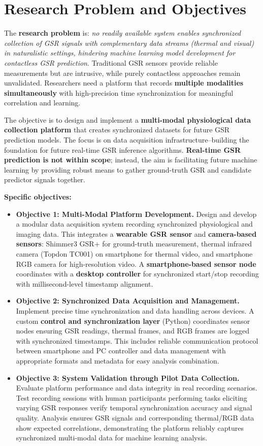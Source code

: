 \section{Research Problem and Objectives}

The \textbf{research problem} is: \textit{no readily available system enables synchronized collection of GSR signals with complementary data streams (thermal and visual) in naturalistic settings, hindering machine learning model development for contactless GSR prediction}. Traditional GSR sensors provide reliable measurements but are intrusive, while purely contactless approaches remain unvalidated. Researchers need a platform that records \textbf{multiple modalities simultaneously} with high-precision time synchronization for meaningful correlation and learning.

The objective is to design and implement a \textbf{multi-modal physiological data collection platform} that creates synchronized datasets for future GSR prediction models. The focus is on data acquisition infrastructure--building the foundation for future real-time GSR inference algorithms. \textbf{Real-time GSR prediction is not within scope}; instead, the aim is facilitating future machine learning by providing robust means to gather ground-truth GSR and candidate predictor signals together.

\textbf{Specific objectives:}
\begin{itemize}
\item \textbf{Objective 1: Multi-Modal Platform Development.} Design and develop a modular data acquisition system recording synchronized physiological and imaging data. This integrates a \textbf{wearable GSR sensor} and \textbf{camera-based sensors}: Shimmer3 GSR+ for ground-truth measurement, thermal infrared camera (Topdon TC001) on smartphone for thermal video, and smartphone RGB camera for high-resolution video. A \textbf{smartphone-based sensor node} coordinates with a \textbf{desktop controller} for synchronized start/stop recording with millisecond-level timestamp alignment.

\item \textbf{Objective 2: Synchronized Data Acquisition and Management.} Implement precise time synchronization and data handling across devices. A custom \textbf{control and synchronization layer} (Python) coordinates sensor nodes ensuring GSR readings, thermal frames, and RGB frames are logged with synchronized timestamps. This includes reliable communication protocol between smartphone and PC controller and data management with appropriate formats and metadata for easy analysis combination.

\item \textbf{Objective 3: System Validation through Pilot Data Collection.} Evaluate platform performance and data integrity in real recording scenarios. Test recording sessions with human participants performing tasks eliciting varying GSR responses verify temporal synchronization accuracy and signal quality. Analysis ensures GSR signals and corresponding thermal/RGB data show expected correlations, demonstrating the platform reliably captures synchronized multi-modal data for machine learning analysis.
\end{itemize}

